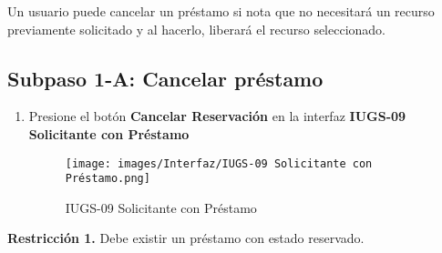 Un usuario puede cancelar un préstamo si nota que no necesitará un recurso previamente solicitado
y al hacerlo, liberará el recurso seleccionado.

\subsection{Subpaso 1-A: Cancelar préstamo}
\begin{enumerate}
	\item Presione el botón \textbf{Cancelar Reservación} en la interfaz
    \textbf{IUGS-09 Solicitante con Préstamo}
    \begin{figure}[hbtp]
	\texttt{[image: images/Interfaz/IUGS-09 Solicitante con Préstamo.png]}
	\caption{IUGS-09 Solicitante con Préstamo}
	\end{figure}
\end{enumerate}

\textbf{Restricción 1.} Debe existir un préstamo con estado reservado.

